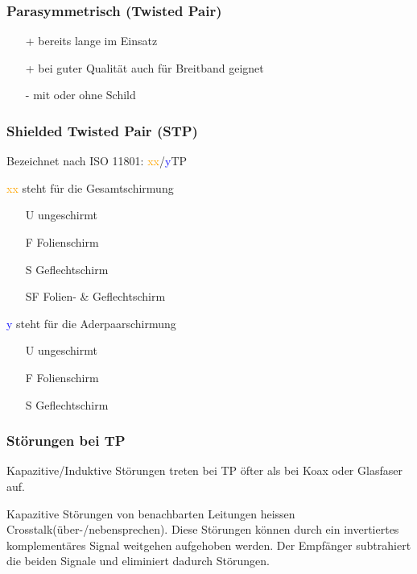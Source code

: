 \subsubsection{Parasymmetrisch (Twisted Pair)}
\begin{itemize}
	\item[+] bereits lange im Einsatz
	\item[+] bei guter Qualität auch für Breitband geignet
	\item[-] mit oder ohne Schild
\end{itemize}

\subsubsection{Shielded Twisted Pair (STP)}

Bezeichnet nach ISO 11801: \textcolor{orange}{xx}/\textcolor{blue}{y}TP

\begin{multicols}{2}
	\textcolor{orange}{xx} steht für die Gesamtschirmung
	\begin{itemize}
		\item[U] ungeschirmt
		\item[F] Folienschirm
		\item[S] Geflechtschirm
		\item[SF] Folien- \& Geflechtschirm
	\end{itemize}

	\columnbreak

	\textcolor{blue}{y} steht für die Aderpaarschirmung
	\begin{itemize}
		\item[U] ungeschirmt
		\item[F] Folienschirm
		\item[S] Geflechtschirm
		\item[\vspace{\fill}]
	\end{itemize}
\end{multicols}


\subsubsection{Störungen bei TP}

Kapazitive/Induktive Störungen treten bei TP öfter als bei Koax oder Glasfaser auf.

Kapazitive Störungen von benachbarten Leitungen heissen Crosstalk(über-/nebensprechen).
Diese Störungen können durch ein invertiertes komplementäres Signal weitgehen aufgehoben werden.
Der Empfänger subtrahiert die beiden Signale und eliminiert dadurch Störungen.


